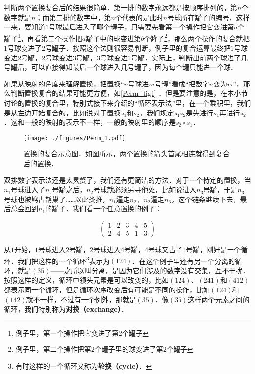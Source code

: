 判断两个置换复合后的结果很简单．第一排的数字永远都是按顺序排列的，第$n$个数字就是$n$；而第二排的数字中，第$n$个代表的是此时$n$号球所在罐子的编号．这样一来，要知道$1$号球最后进入了哪个罐子，只需要先看第一个操作把它变进第$a$个罐子\footnote{例子里，第一个操作把它变进了第$2$个罐子}，再看第二个操作把$a$罐子中的球变进第$b$个罐子\footnote{例子里，第二个操作把第$2$个罐子里的球变进了第$2$个罐子}，那么两个操作的复合就把$1$号球变进了$2$号罐子．按照这个法则很容易判断，例子里的复合运算最终把$1$号球变进$2$号罐，$2$号球变进$3$号罐，$3$号球变进$1$号罐．实际上，判断出前两个球进了几号罐后，可以直接得知最后一个球进入几号罐了，因为每个罐只能进一个球．

如果从映射的角度来理解置换，把置换“$n$号球进$m$号罐”看成“把数字$n$变为$m$”，那么判断置换复合的结果可能更方便，如\autoref{Perm_fig1} ．但是要注意的是，在本小节讨论的置换的复合里，特别式接下来介绍的“循环表示法”里，在一个乘积里，我们是从左边开始复合的，比如说对于置换$s_1$和$s_2$，我们规定$s_1s_2$是先进行$s_1$再进行$s_2$．这和一般的映射的表示不一样，一般的映射里的顺序是$s_2\circ s_1$．






\begin{figure}[ht]
\centering
\texttt{[image: ./figures/Perm\_1.pdf]}
\caption{置换的复合示意图．如图所示，两个置换的箭头首尾相连就得到复合后的置换．} \label{Perm_fig1}
\end{figure}


双排数字表示法还是太累赘了，我们还有更简洁的方法．对于一个特定的置换，当$n_1$号球进入了$n_2$号罐之后，$n_2$号球就必须另寻他处，比如说进入$n_3$号罐，于是$n_3$号球也被鸠占鹊巢了……以此类推，$n_1$逼走$n_2$，$n_2$逼走$n_3$，这个链条继续下去，最后总会回到$n_1$的罐子．我们看一个任意置换的例子：

\begin{equation}\label{Perm_eq1}\begin{pmatrix}
1&2&3&4&5\\2&4&5&1&3
\end{pmatrix}\end{equation}

从$1$开始，$1$号球进入$2$号罐，$2$号球进入$4$号罐，$4$号球又占了$1$号罐，刚好是一个循环．我们把这样的一个循环\footnote{有时这样的一个循环又称为\textbf{轮换（cycle）}．}表示为$(1 2 4)$．在这个例子里还有另一个分离的循环，就是$(3 5)$——之所以叫分离，是因为它们涉及的数字没有交集，互不干扰．按照这样的定义，循环中领头元素是可以改变的，比如$(1 2 4)$、$(2 4 1)$和$(4 1 2)$都表示同一个循环，但是循环次序改变后有可能是不同的操作，比如$(1 2 4)$和$(1 4 2)$就不一样，不过有一个例外，那就是$(3 5)$．像$(3 5)$这样两个元素之间的循环，我们特别称为\textbf{对换（exchange）}．


